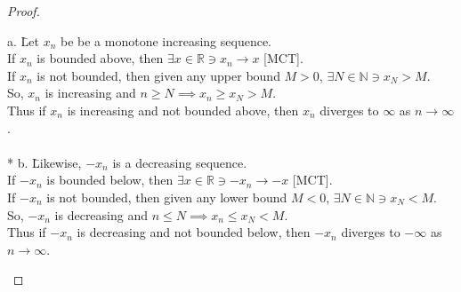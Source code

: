 \documentclass[a4paper]{article}
\newcommand{\real}{\mathbb{R}}
\newcommand{\nat}{\mathbb{N}}
\begin{document}
\begin{flushleft}
\begin{proof}
            \begin{tabbing}
                a.  \= Let {$x_n$} be be a monotone increasing sequence. \\
                          \> If {$x_n$} is bounded above, then $\exists x \in \real \ni x_n \to x$ [MCT]. \\
                          \> If {$x_n$} is not bounded, then given any upper bound $M > 0$, $\exists N \in \nat \ni x_N > M$. \\
                          \> So, {$x_n$} is increasing and $n \geq N \implies x_n \geq x_N > M$. \\
                          \> Thus if {$x_n$} is increasing and not bounded above, then {$x_n$} diverges to $\infty$ as $n \to \infty$. \\
                          \mbox{}\\*
                b. \= Likewise, $-${$x_n$} is a decreasing sequence. \\
                   \> If $-${$x_n$} is bounded below, then $\exists x \in \real \ni -x_n \to -x$ [MCT]. \\
                   \> If $-${$x_n$} is not bounded, then given any lower bound $M < 0$, $\exists N \in \nat \ni x_N < M$. \\
                   \> So, $-${$x_n$} is decreasing and $n \leq N \implies x_n \leq x_N < M$. \\
                   \> Thus if $-${$x_n$} is decreasing and not bounded below, then $-${$x_n$} diverges to $-\infty$ as $n \to \infty$.
            \end{tabbing}
            
        \end{proof}

    \end{flushleft}
\end{document}
